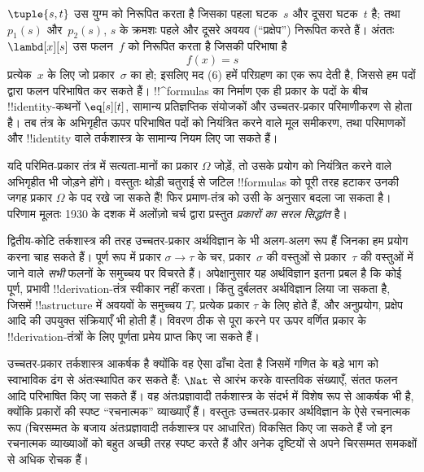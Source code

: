 \documentclass[../../../include/open-logic-section]{subfiles}
\begin{document}
$\tuple{s, t}$ उस युग्म को निरूपित करता है जिसका पहला घटक~$s$ और दूसरा
घटक~$t$ है; तथा $p_1(s)$ और~$p_2(s)$, $s$ के क्रमशः पहले और दूसरे अवयव
(``प्रक्षेप'') निरूपित करते हैं। अंततः $\lambd[x][s]$ उस फलन~$f$ को निरूपित
करता है जिसकी परिभाषा है
\[
f(x) = s
\]
प्रत्येक~$x$ के लिए जो प्रकार~$\sigma$ का हो; इसलिए मद (6) हमें परिग्रहण का
एक रूप देती है, जिससे हम पदों द्वारा फलन
परिभाषित कर सकते हैं। !!^{formula}s का निर्माण एक ही प्रकार के पदों के बीच
!!{identity}-कथनों $\eq[s][t]$, सामान्य प्रतिज्ञप्तिक संयोजकों और
उच्चतर-प्रकार परिमाणीकरण से होता है। तब तंत्र के अभिगृहीत ऊपर परिभाषित पदों
को नियंत्रित करने वाले मूल समीकरण, तथा परिमाणकों और !!{identity} वाले
तर्कशास्त्र के सामान्य नियम लिए जा सकते हैं।

यदि परिमित-प्रकार तंत्र में सत्यता-मानों का प्रकार $\Omega$ जोड़ें, तो उसके
प्रयोग को नियंत्रित करने वाले अभिगृहीत भी जोड़ने होंगे। वस्तुतः थोड़ी चतुराई
से जटिल !!{formula}s को पूरी तरह हटाकर उनकी जगह प्रकार $\Omega$ के पद रखे जा
सकते हैं!{} फिर प्रमाण-तंत्र को उसी के अनुसार बदला जा सकता है। परिणाम मूलतः
1930 के दशक में अलोंज़ो चर्च द्वारा प्रस्तुत \emph{प्रकारों का सरल सिद्धांत}
है।

द्वितीय-कोटि तर्कशास्त्र की तरह उच्चतर-प्रकार अर्थविज्ञान के भी अलग-अलग रूप
हैं जिनका हम प्रयोग करना चाह सकते हैं। पूर्ण रूप में प्रकार $\sigma \to \tau$
के चर, प्रकार~$\sigma$ की वस्तुओं से प्रकार~$\tau$ की वस्तुओं में
जाने वाले \emph{सभी} फलनों के समुच्चय पर विचरते हैं। अपेक्षानुसार यह
अर्थविज्ञान इतना प्रबल है कि कोई पूर्ण, प्रभावी !!{derivation}-तंत्र स्वीकार
नहीं करता। किंतु दुर्बलतर अर्थविज्ञान लिया जा सकता है, जिसमें
!!a{structure} में अवयवों के समुच्चय $T_\tau$ प्रत्येक प्रकार $\tau$ के लिए
होते हैं, और अनुप्रयोग, प्रक्षेप आदि की उपयुक्त संक्रियाएँ भी होती हैं। विवरण ठीक से
पूरा करने पर ऊपर वर्णित प्रकार के !!{derivation}-तंत्रों के लिए पूर्णता
प्रमेय प्राप्त किए जा सकते हैं।

उच्चतर-प्रकार तर्कशास्त्र आकर्षक है क्योंकि वह ऐसा ढाँचा देता है जिसमें
गणित के बड़े भाग को स्वाभाविक ढंग से अंतःस्थापित कर सकते हैं: $\Nat$ से
आरंभ करके वास्तविक संख्याएँ, संतत फलन आदि परिभाषित किए जा सकते हैं। वह
अंतःप्रज्ञावादी तर्कशास्त्र के संदर्भ में विशेष रूप से आकर्षक भी है, क्योंकि
प्रकारों की स्पष्ट ``रचनात्मक'' व्याख्याएँ हैं। वस्तुतः उच्चतर-प्रकार
अर्थविज्ञान के ऐसे रचनात्मक रूप (चिरसम्मत के बजाय अंतःप्रज्ञावादी
तर्कशास्त्र पर आधारित) विकसित किए जा सकते हैं जो इन रचनात्मक व्याख्याओं को
बहुत अच्छी तरह स्पष्ट करते हैं और अनेक दृष्टियों से अपने चिरसम्मत समकक्षों
से अधिक रोचक हैं।
\end{document}
